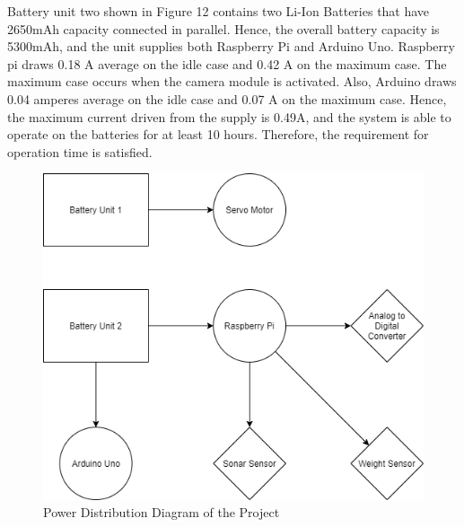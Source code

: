    Battery unit two shown in Figure 12 contains two Li-Ion Batteries that have 2650mAh capacity connected in parallel. Hence, the overall battery capacity is 5300mAh, and the unit supplies both Raspberry Pi and Arduino Uno. Raspberry pi draws 0.18 A average on the idle case and 0.42 A on the maximum case. The maximum case occurs when the camera module is activated. Also, Arduino draws 0.04 amperes average on the idle case and 0.07 A on the maximum case. Hence, the maximum current driven from the supply is 0.49A, and the system is able to operate on the batteries for at least 10 hours. Therefore, the requirement for operation time is satisfied.    
    
    

\begin{figure}[ht]
     \centering
     \includegraphics[width=0.75\linewidth]{content/150_power_analysis/powerdiagram.png}
     \caption{ Power Distribution Diagram of the Project}
     \label{fig:powerdist}
\end{figure}